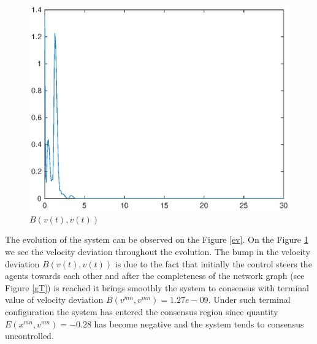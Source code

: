 \documentclass[a4paper,10pt, english]{article}
\begin{document}
 
 \begin{figure}[ht]
 \centering
 \includegraphics[scale=0.5]{figures/a5_D_lf.eps}
 \caption{$B(v(t), v(t))$}
 \label{lf}
 \end{figure}
  \newpage
The evolution of the system can be observed on the Figure \ref{ev}. On the Figure \ref{lf} we see the velocity deviation throughout the evolution. The bump in the velocity deviation $B(v(t), v(t))$
is due to the fact that initially the control steers the agents towards each other and after the completeness of the network graph (see Figure \ref{gT}) is reached it brings smoothly the system to consensus with terminal value of velocity deviation $B(v^{mn}, v^{mn}) = 1.27e-09$. Under such terminal configuration the system has entered the consensus region since quantity $E(x^{mn}, v^{mn}) = -0.28$ has become negative and the system tends to consensus uncontrolled.
\end{document}
